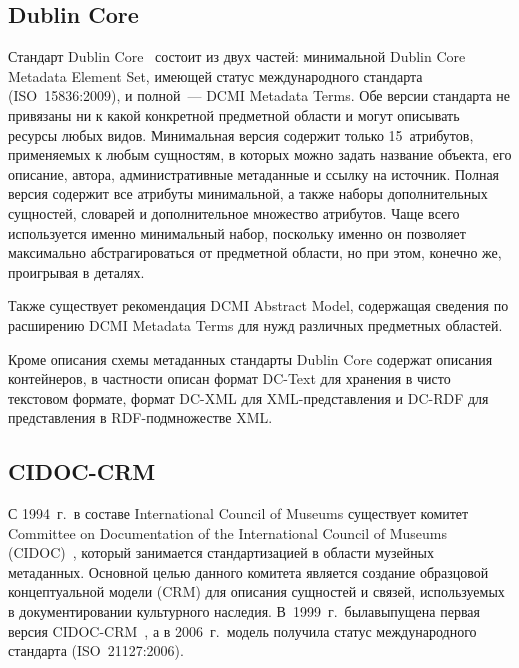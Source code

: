 \begin{multicols}{2}
\vspace*{-12pt}

  \subsection*{Dublin Core}
  
  Стандарт Dublin Core~\cite{11ser} состоит из двух час\-тей: минимальной Dublin Core 
Metadata Element Set, имеющей статус международного стандарта (ISO~15836:2009), и 
полной~--- DCMI Metadata Terms. Обе версии стандарта не привязаны ни к какой конкретной 
предметной области и могут описывать ресурсы любых видов. Минимальная версия 
содержит только 15~атрибутов, применяемых к любым сущностям, в которых можно задать 
название объекта, его описание, автора, административные метаданные и ссылку на 
источник. Полная версия содержит все атрибуты минимальной, а также наборы 
дополнительных сущностей, словарей и дополнительное множество атрибутов. Чаще всего 
используется именно минимальный набор, поскольку именно он позволяет максимально 
абстрагироваться от предметной области, но при этом, конечно же, проигрывая в деталях.
  
  Также существует рекомендация DCMI Abstract Model, содержащая сведения по 
расширению \mbox{DCMI} Metadata Terms для нужд различных предметных областей.
  
  Кроме описания схемы метаданных стандарты Dublin Core содержат описания 
контейнеров, в частности описан формат DC-Text для хранения в чисто текстовом формате, 
формат DC-XML для XML-представления и DC-RDF для представления в 
  RDF-подмножестве XML.
  
\vspace*{-12pt}

  \subsection*{CIDOC-CRM}
  
  С 1994~г.\ в составе International Council of Museums существует комитет Committee on 
Documentation of the International Council of Museums (CIDOC)~\cite{12ser}, который 
занимается стандартизацией в области музейных метаданных. Основной \mbox{целью} данного 
комитета является создание образцовой концептуальной модели (CRM) для описания 
сущностей и связей, используемых в документировании культурного наследия. В~1999~г.\ 
была\linebreak выпущена первая версия CIDOC-CRM~\cite{16ser}, а в 2006~г.\ модель получила 
статус международного стандарта (ISO~21127:2006).
  

\end{multicols}
